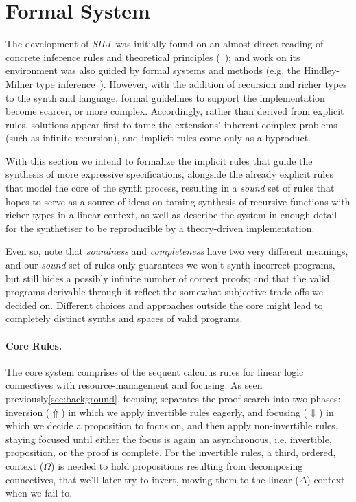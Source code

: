 \documentclass{llncs}
\newcommand{\mypara}[1]{\paragraph{\textbf{#1}.}}
\newcommand{\synname}{\emph{SILI}}
\begin{document}


\section{Formal System}\label{sec:formal_system}

The development of \synname\ was initially found on an almost direct reading of
concrete inference rules and theoretical principles (~\cite{frank pfenning notes}); and work on its environment
was also guided by formal systems and methods (e.g. the Hindley-Milner type
inference~\cite{}).  However, with the addition of recursion and richer types to
the synth and language, formal guidelines to support the implementation become
scarcer, or more complex. Accordingly, rather than derived from explicit rules,
solutions appear first to tame the extensions' inherent complex problems (such
as infinite recursion), and implicit rules come only as a byproduct.

With this section we intend to formalize the implicit rules that guide the
synthesis of more expressive specifications, alongside the already explicit
rules that model the core of the synth process, resulting in a \emph{sound} set
of rules that hopes to serve as a source of ideas on taming synthesis of
recursive functions with richer types in a linear context, as well as describe
the system in enough detail for the synthetiser to be reproducible by a
theory-driven implementation.

Even so, note that \emph{soundness} and \emph{completeness} have two very
different meanings, and our \emph{sound} set of rules only guarantees we won't
synth incorrect programs, but still hides a possibly infinite number of correct
proofs; and that the valid programs derivable through it reflect the somewhat
subjective trade-offs we decided on. Different choices and approaches outside
the core might lead to completely distinct synths and spaces of valid programs.

\mypara{Core Rules} The core system comprises of the sequent calculus rules for
linear logic connectives with resource-management and focusing. As seen
previously\ref{sec:background}, focusing separates the proof search into two
phases: inversion ($\Uparrow$) in which we apply invertible rules eagerly, and
focusing ($\Downarrow$) in which we decide a proposition to focus on, and then
apply non-invertible rules, staying focused until either the focus is again an
asynchronous, i.e. invertible, proposition, or the proof is complete.  For the
invertible rules, a third, ordered, context ($\Omega$) is needed to hold
propositions resulting from decomposing connectives, that we'll later try to
invert, moving them to the linear ($\Delta$) context when we fail to.
\end{document}
